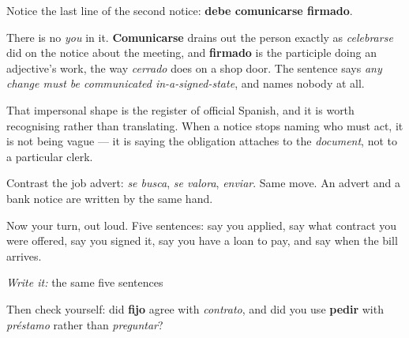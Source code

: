 \begin{culture}
Notice the last line of the second notice: \textbf{debe comunicarse firmado}.

There is no \emph{you} in it. \textbf{Comunicarse} drains out the person exactly as \emph{celebrarse} did on the notice about the meeting, and \textbf{firmado} is the participle doing an adjective's work, the way \emph{cerrado} does on a shop door. The sentence says \emph{any change must be communicated in-a-signed-state}, and names nobody at all.

That impersonal shape is the register of official Spanish, and it is worth recognising rather than translating. When a notice stops naming who must act, it is not being vague — it is saying the obligation attaches to the \emph{document}, not to a particular clerk.

Contrast the job advert: \emph{se busca}, \emph{se valora}, \emph{enviar}. Same move. An advert and a bank notice are written by the same hand.
\end{culture}

\begin{tcolorbox}[breakable,colback=teal!4,colframe=teal!35!black,title={Before you move on}]
Now your turn, out loud. Five sentences: say you applied, say what contract you were offered, say you signed it, say you have a loan to pay, and say when the bill arrives.

\emph{Write it:} the same five sentences

Then check yourself: did \textbf{fijo} agree with \emph{contrato}, and did you use \textbf{pedir} with \emph{préstamo} rather than \emph{preguntar}?
\end{tcolorbox}
